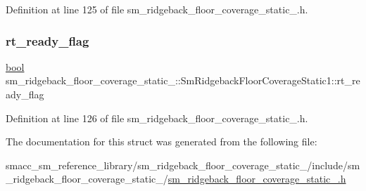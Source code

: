 Definition at line 125 of file sm\+\_\+ridgeback\+\_\+floor\+\_\+coverage\+\_\+static\+\_.\+h.

\mbox{\label{structsm__ridgeback__floor__coverage__static__1_1_1SmRidgebackFloorCoverageStatic1_a6b31072566a8039b4165b803b8468069}} 
\subsubsection{\texorpdfstring{rt\+\_\+ready\+\_\+flag}{rt\_ready\_flag}}
{\footnotesize\ttfamily \hyperlink{classbool}{bool} sm\+\_\+ridgeback\+\_\+floor\+\_\+coverage\+\_\+static\+\_\+::\+Sm\+Ridgeback\+Floor\+Coverage\+Static1\+::rt\+\_\+ready\+\_\+flag}



Definition at line 126 of file sm\+\_\+ridgeback\+\_\+floor\+\_\+coverage\+\_\+static\+\_.\+h.



The documentation for this struct was generated from the following file\+:\begin{DoxyCompactItemize}
\item 
smacc\+\_\+sm\+\_\+reference\+\_\+library/sm\+\_\+ridgeback\+\_\+floor\+\_\+coverage\+\_\+static\+\_/include/sm\+\_\+ridgeback\+\_\+floor\+\_\+coverage\+\_\+static\+\_/\hyperlink{sm__ridgeback__floor__coverage__static__1_8h}{sm\+\_\+ridgeback\+\_\+floor\+\_\+coverage\+\_\+static\+\_.\+h}\end{DoxyCompactItemize}
